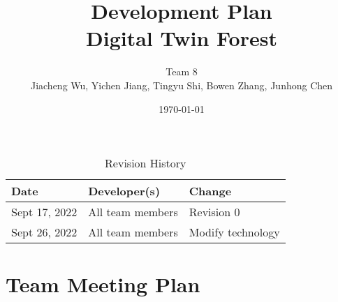 \documentclass{article}
\title{Development Plan\\ Digital Twin Forest}
\author{Team 8\\Jiacheng Wu, Yichen Jiang, Tingyu Shi, Bowen Zhang, Junhong Chen}
\date{\today}
\begin{document}
 
\maketitle

\begin{table}[hp]
\centering
\caption{Revision History} \label{TblRevisionHistory}
\begin{tabularx}{\textwidth}{XXX}
\toprule
\textbf{Date} & \textbf{Developer(s)} & \textbf{Change}\\
\midrule
Sept 17, 2022 & All team members & Revision 0\\
Sept 26, 2022 & All team members & Modify technology\\
\bottomrule
\end{tabularx}
\end{table}
\section{Team Meeting Plan}
\end{document}
